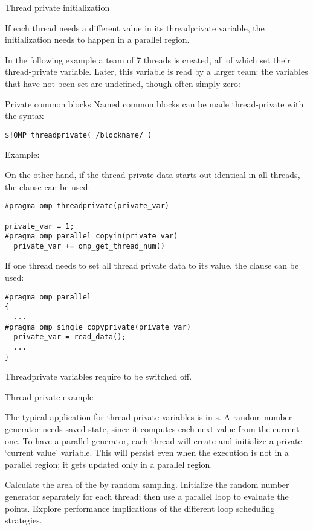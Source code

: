  {Thread private initialization}

If each thread needs a different value in its threadprivate variable,
the initialization needs to happen in a parallel region.

In the following example a team of 7 threads is created, all of which
set their thread-private variable. Later, this variable is read by a
larger team: the variables that have not been set are undefined,
though often simply zero:
%

\begin{fortrannote}{Private common blocks}
  Named common blocks can be made thread-private with the syntax
\begin{lstlisting}
$!OMP threadprivate( /blockname/ )
\end{lstlisting}
Example:
%
%
\end{fortrannote}

On the other hand, if the thread private data starts out identical in
all threads, the  clause can be used:
\begin{lstlisting}
#pragma omp threadprivate(private_var)

private_var = 1;
#pragma omp parallel copyin(private_var)
  private_var += omp_get_thread_num()
\end{lstlisting}

If one thread needs to set all thread private data to its value, the
 clause can be used:
\begin{lstlisting}
#pragma omp parallel
{
  ...
#pragma omp single copyprivate(private_var)
  private_var = read_data();
  ...
}
\end{lstlisting}

Threadprivate variables require  to be
switched off.

 {Thread private example}

The typical application for thread-private variables is in
s.
A random number generator needs saved state, since it computes each next value
from the current one. To have a parallel generator, each thread will create
and initialize a private `current value' variable. This will persist
even when the execution is not in a parallel region; it gets updated only
in a parallel region.

\begin{exercise}
  \label{ex:random-mandel}
  Calculate the area of the  by random
  sampling. Initialize the random number generator separately for each
  thread; then use a parallel loop to evaluate the points.
  Explore performance implications of the different loop scheduling strategies.
\end{exercise}

